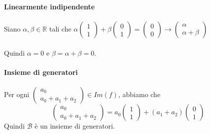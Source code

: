 \documentclass[12pt]{article}
\begin{document}
\textbf{Linearmente indipendente} \\\\
Siano $\alpha, \beta \in \mathbb{R}$ tali che $\alpha \begin{pmatrix}
    1\\
    1
\end{pmatrix} + \beta \begin{pmatrix}
    0\\
    1
\end{pmatrix} = \begin{pmatrix}
    0\\
    0
\end{pmatrix} \rightarrow \begin{pmatrix}
    \alpha\\
    \alpha + \beta
\end{pmatrix}$\\\\
Quindi $\alpha = 0$ e $\beta = \alpha + \beta = 0$.\\\\
\textbf{Insieme di generatori}\\\\
Per ogni $\begin{pmatrix}
    a_0\\
    a_0 + a_1 + a_2
\end{pmatrix} \in Im(f)$, abbiamo che
\[\begin{pmatrix}
    a_0\\
    a_0 + a_1 + a_2
\end{pmatrix} = a_0 \begin{pmatrix}
    1\\
    1
\end{pmatrix} + (a_1 + a_2) \begin{pmatrix}
    0\\
    1
\end{pmatrix}\]
Quindi $\mathcal{B}$ è un insieme di generatori.
\end{document}
